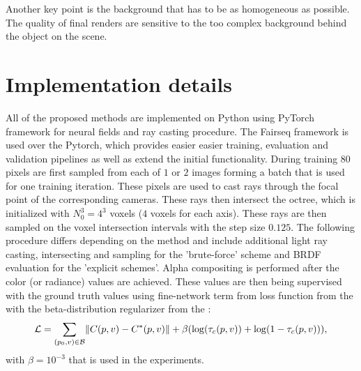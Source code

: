 Another key point is the background that has to be as homogeneous as possible.
The quality of final renders are sensitive to the too complex background behind the object on the scene.





\section{Implementation details}

All of the proposed methods are implemented on Python
using PyTorch \cite{pytorch} framework
for neural fields and ray casting procedure.
The Fairseq \cite{ott2019fairseq} framework is used over the Pytorch,
which provides easier easier training, evaluation and validation pipelines as well as extend the initial functionality.
During training $80$ pixels are first sampled from each of $1$ or $2$ images 
forming a batch that is used for one training iteration.
These pixels are used to cast rays through the focal point of the corresponding cameras.
These rays then intersect the octree, which is initialized with $N_0^3 = 4^3$ voxels ($4$ voxels for each axis).
These rays are then sampled on the voxel intersection intervals with the step size $0.125$.
The following procedure differs depending on the method
and include additional light ray casting, intersecting and sampling for the 'brute-force' scheme and BRDF evaluation for the 'explicit schemes'.
Alpha compositing is performed after the color (or radiance) values are achieved.
These values are then being supervised with the ground truth values using fine-network term from loss function from the  with the beta-distribution regularizer from the :
\begin{equation}
    \mathcal{L} = \sum_{(p_0,v)\in\mathcal{B}} \norm{ C(p, v) - C^*(p, v) } + \beta(\log(\tau_c(p, v)) + \log(1 - \tau_c(p, v))),
\end{equation}
with $\beta = 10^{-3}$ that is used in the experiments.

